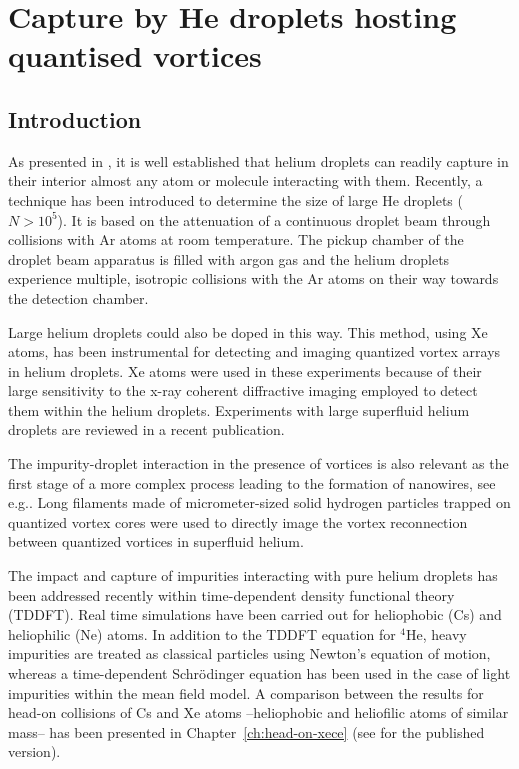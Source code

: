 \chapter{Capture by He droplets hosting quantised vortices}\label{ch:capture}
	\section{Introduction}
		As presented in , it is well established that helium droplets can readily capture in their interior almost any atom or molecule interacting with them. Recently, a technique has been introduced to determine the size of large He droplets ($N> 10^5$). It is based on the attenuation of a continuous droplet beam through collisions with Ar atoms at room temperature\citep{Gom11}. The pickup chamber of the droplet beam apparatus is filled with argon gas and the helium droplets experience multiple, isotropic collisions with the Ar atoms on their way towards the detection chamber. 

		Large helium droplets could also be doped in this way. This method, using Xe atoms, has been instrumental for detecting and imaging quantized vortex arrays in helium droplets\citep{Gom14,Jones2016}. Xe atoms were used in these experiments because of their large sensitivity to the x-ray coherent diffractive imaging employed to detect them within the helium droplets. Experiments with large superfluid helium droplets are reviewed in a recent publication\citep{Tan17}.

		The impurity-droplet interaction in the presence of vortices is also relevant as the first stage of a more complex process leading to the formation of nanowires, see e.g.. Long filaments made of micrometer-sized solid hydrogen particles trapped on quantized vortex cores were used to directly image the vortex reconnection between quantized vortices in superfluid helium\citep{Bewley2008}.

		The impact and capture of impurities interacting with pure helium droplets has been addressed recently within time-dependent density functional theory (TDDFT).
Real time simulations have been carried out for 
heliophobic\citep{Lea14a} (Cs) and heliophilic\citep{Vil16b} (Ne) atoms. In addition to the 
TDDFT equation for $^4$He, heavy impurities are treated as 
classical particles using
Newton's equation of motion, whereas a time-dependent 
Schr\"odinger equation has been used in the case of  
light impurities within the mean field model\citep{Her12a,Vil16b}.  
A comparison between the results for head-on collisions of Cs and Xe 
atoms --heliophobic and heliofilic atoms of similar mass-- has been presented in Chapter~\ref{ch:head-on-xece} (see for the published version).

